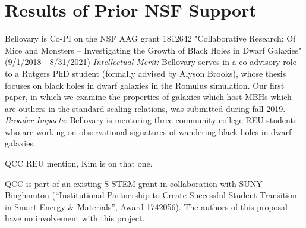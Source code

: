 \documentclass[12pt]{article}
\begin{document}
\section{Results of Prior NSF Support}
\vspace{-3mm}
Bellovary is Co-PI on the NSF AAG grant 1812642 "Collaborative Research: Of Mice and Monsters -- Investigating the Growth of Black Holes in Dwarf Galaxies" (9/1/2018 - 8/31/2021)  {\em Intellectual Merit:}  Bellovary serves in a co-advisory role to a Rutgers PhD student (formally advised by Alyson Brooks), whose thesis focuses on black holes in dwarf galaxies in the Romulus simulation.  Our first paper, in which we examine the properties of galaxies which host MBHs which are outliers in the standard scaling relations, was submitted during fall 2019.  {\em Broader Impacts:}  Bellovary is mentoring three community college REU students who are working on observational signatures of wandering black holes in dwarf galaxies.

QCC REU mention, Kim is on that one.

QCC is part of an existing S-STEM grant in collaboration with SUNY-Binghamton (``Institutional Partnership to Create Successful Student Transition in Smart Energy \& Materials'', Award 1742056).  The authors of this proposal have no involvement with this project.

\newpage

\end{document}
